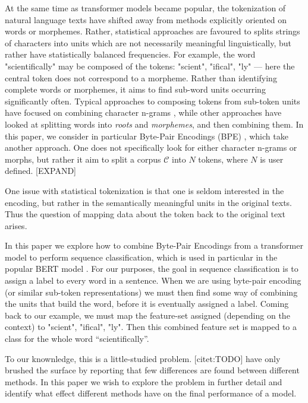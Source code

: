 \documentclass[11pt]{article}
\begin{document}
	At the same time as transformer models became popular, the
        tokenization of natural language texts have shifted away from
        methods explicitly oriented on words or morphemes. Rather,
        statistical approaches are favoured to splits strings of
        characters into units which are not necessarily meaningful
        linguistically, but rather have statistically balanced
        frequencies. For example, the word "scientifically" may be
        composed of the tokens: "scient", "ifical", "ly" --- here the
        central token does not correspond to a morpheme.
            Rather than identifying complete words or morphemes, it
     aims to find sub-word units occurring significantly
     often. Typical approaches to composing tokens from sub-token
     units have focused on combining character n-grams
     \citep{bojanowski2017enriching}, while other approaches have
     looked at splitting words into \textit{roots} and
     \textit{morphemes}, and then combining them. In this paper, we
     consider in particular Byte-Pair Encodings (BPE)
     \citep{sennrich2015neural}, which take another approach. One does
     not specifically look for either character n-grams or morphs, but
     rather it aim to split a corpus $\mathcal{C}$ into $N$ tokens,
     where $N$ is user defined. [EXPAND]

        One issue with statistical tokenization is that one is seldom
        interested in the encoding, but rather in the semantically
        meaningful units in the original texts. Thus the question of
        mapping data about the token back to the original text arises.
        
    	In this paper we explore how to combine Byte-Pair Encodings
     from a transformer model to perform sequence classification,
     which is used in particular in the popular BERT model
     \citep{devlin2018bert}. For our purposes, the goal in sequence
     classification is to assign a label to every word in a
     sentence. When we are using byte-pair encoding (or similar
     sub-token representations) we must then find some way of
     combining the units that build the word, before it is eventually
     assigned a label. Coming back to our example, we must map the
     feature-set assigned (depending on the context) to "scient",
     "ifical", "ly". Then this combined feature set is mapped to a
     class for the whole word ``scientifically''.

	To our knownledge, this is a little-studied
        problem. [citet:TODO] have only brushed the surface by
        reporting that few differences are found between different
        methods. In this paper we wish to explore the problem in
        further detail and identify what effect different methods have
        on the final performance of a model.
\end{document}
